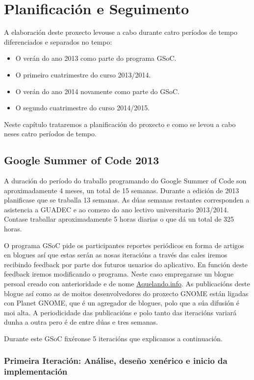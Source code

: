 \chapter{Planificación e Seguimento}

A elaboración deste proxecto levouse a cabo durante catro períodos de tempo diferenciados e separados no tempo:

\begin{itemize}
  \item O verán do ano 2013 como parte do programa GSoC.
  \item O primeiro cuatrimestre do curso 2013/2014.
  \item O verán do ano 2014 novamente como parte do GSoC.
  \item O segundo cuatrimestre do curso 2014/2015.
\end{itemize}

Neste capítulo trataremos a planificación do proxecto e como se levou a cabo neses catro períodos de tempo.

\section{Google Summer of Code 2013}
A duración do período do traballo programando do Google Summer of Code son aproximadamente 4 meses, un total de 15 semanas. Durante a edición de 2013 planificase que se traballa 13 semanas. As dúas semanas restantes corresponden a asistencia a GUADEC e ao comezo do ano lectivo universitario 2013/2014. Contase traballar aproximadamente 5 horas diarias o que dá un total de 325 horas.

O programa GSoC pide os participantes reportes periódicos en forma de artigos en blogues así que estas serán as nosas iteracións a través das cales iremos recibindo feedback por parte dos futuros usuarios do aplicativo. En función deste feedback iremos modificando o programa. Neste caso empregarase un blogue persoal creado con anterioridade e de nome \href{http://aquelando.info}{Aquelando.info}. As publicacións deste blogue así como as de moitos desenvolvedores do proxecto GNOME están ligadas con Planet GNOME, que é un agregador de blogues, polo que a súa difusión é moi alta. A periodicidade das publicacións e polo tanto das iteracións variará dunha a outra pero é de entre dúas e tres semanas.

Durante este GSoC fixéronse 5 iteracións que explicamos a continuación.

\subsection{Primeira Iteración: Análise, deseño xenérico e inicio da implementación}


